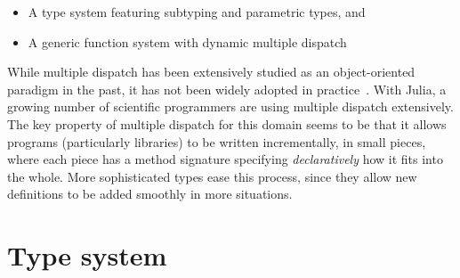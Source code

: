 \documentclass[10pt, preprint]{sigplanconf}
\begin{document}
\begin{itemize}
	\item A type system featuring subtyping and parametric types, and
	\item A generic function system with dynamic multiple dispatch
\end{itemize}
%



While multiple dispatch has been extensively studied as an object-oriented
paradigm in the past, it has not been widely adopted in practice~\cite{Muschevici:2008}.
With Julia, a growing number of scientific programmers are using multiple dispatch
extensively. The key property of multiple
dispatch for this domain seems to be that it allows programs (particularly libraries)
to be written incrementally, in small pieces, where each piece has a method signature
specifying \emph{declaratively} how it fits into the whole.
More sophisticated types ease this process, since they allow new
definitions to be added smoothly in more situations.


\section{Type system}
\end{document}
